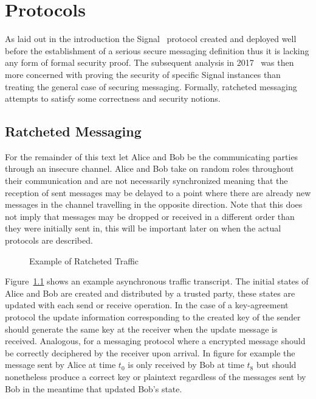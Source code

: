 \documentclass[11pt,a4paper,twoside,openright,bibliography=totoc]{scrbook}
\begin{document}
\chapter{Protocols}
\label{chap:protocols}

As laid out in the introduction the Signal~\cite{perrin2016double}
protocol created and deployed well before the establishment of a
serious secure messaging definition thus it is lacking any form of
formal security proof. The subsequent analysis in 2017~\cite{cohn2017formal}
was then more concerned with proving the security of specific Signal
instances than treating the general case of securing
messaging. Formally, ratcheted messaging attempts to satisfy some
correctness and security notions.


\section{Ratcheted Messaging}
\label{sec:ratcheted-messaging}

For the remainder of this text let Alice and Bob be the communicating
parties through an insecure channel. Alice and Bob take on random
roles throughout their communication and are not necessarily
synchronized meaning that the reception of sent messages may be
delayed to a point where there are already new messages in the channel
travelling in the opposite direction. Note that this does not imply
that messages may be dropped or received in a different order than
they were initially sent in, this will be important later on when
the actual protocols are described.
\begin{figure}[ht]
  \centering
   
  \caption{Example of Ratcheted Traffic}
  \label{fig:traffic}
\end{figure}
Figure~\ref{fig:traffic} shows an example asynchronous traffic
transcript. The initial states of Alice and Bob are created and
distributed by a trusted party, these states are updated with each
send or receive operation. In the case of a key-agreement protocol the
update information corresponding to the created key of the sender
should generate the same key at the receiver when the update message
is received. Analogous, for a messaging protocol where a encrypted
message should be correctly deciphered by the receiver upon
arrival. In figure for example the message sent by Alice at time $t_0$
is only received by Bob at time $t_8$ but should nonetheless produce a
correct key or plaintext regardless of the messages sent by Bob in the
meantime that updated Bob's state.
\end{document}
